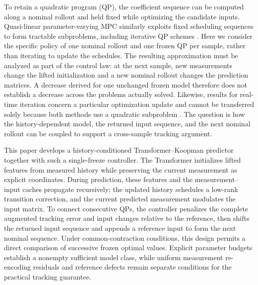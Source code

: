 \documentclass[journal]{IEEEtran}
\begin{document}
To retain a quadratic program (QP), the coefficient sequence can be computed along a nominal rollout and held fixed while optimizing the candidate inputs. Quasi-linear parameter-varying MPC similarly exploits fixed scheduling sequences to form tractable subproblems, including iterative QP schemes \cite{cisneros2016qlmpc,cisneros2020qlpv}. Here we consider the specific policy of one nominal rollout and one frozen QP per sample, rather than iterating to update the schedules. The resulting approximation must be analyzed as part of the control law: at the next sample, new measurements change the lifted initialization and a new nominal rollout changes the prediction matrices. A decrease derived for one unchanged frozen model therefore does not establish a decrease across the problems actually solved. Likewise, results for real-time iteration concern a particular optimization update and cannot be transferred solely because both methods use a quadratic subproblem \cite{diehl2005realtime,gros2020rti}. The question is how the history-dependent model, the returned input sequence, and the next nominal rollout can be coupled to support a cross-sample tracking argument.

This paper develops a history-conditioned Transformer--Koopman predictor together with such a single-freeze controller. The Transformer initializes lifted features from measured history while preserving the current measurement as explicit coordinates. During prediction, these features and the measurement--input caches propagate recursively; the updated history schedules a low-rank transition correction, and the current predicted measurement modulates the input matrix. To connect consecutive QPs, the controller penalizes the complete augmented tracking error and input changes relative to the reference, then shifts the returned input sequence and appends a reference input to form the next nominal sequence. Under common-contraction conditions, this design permits a direct comparison of successive frozen optimal values. Explicit parameter budgets establish a nonempty sufficient model class, while uniform measurement re-encoding residuals and reference defects remain separate conditions for the practical tracking guarantee.
\end{document}

